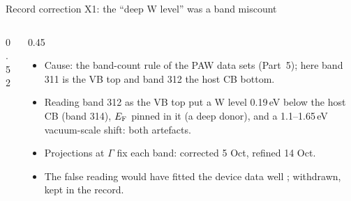 \begin{frame}{Record correction X1: the ``deep W level'' was a band miscount}
\begin{columns}[T,onlytextwidth]
\begin{column}{0.52\textwidth}
    \end{column}
    \begin{column}{0.45\textwidth}
      \begin{itemize}
        \item Cause: the band-count rule of the PAW data sets (Part~5); here band 311 is the VB top and band 312 the
          host CB bottom.
        \item Reading band 312 as the VB top put a W level 0.19\,eV below the host CB (band 314), $E_{\mathrm{F}}$ pinned in it
          (a deep donor), and a 1.1--1.65\,eV vacuum-scale shift: both artefacts.
        \item Projections at $\Gamma$ fix each band: corrected 5 Oct, refined 14 Oct.
        \item The false reading would have fitted the device data well ; withdrawn, kept in the record.
      \end{itemize}
    \end{column}
  \end{columns}
\end{frame}

